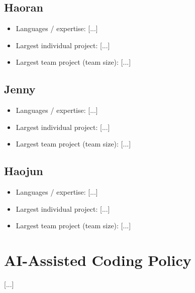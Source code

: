 \documentclass[11pt]{article}
\begin{document}
\subsection{Haoran}
\begin{itemize}[nosep]
    \item Languages / expertise: [...]
    \item Largest individual project: [...]
    \item Largest team project (team size): [...]
\end{itemize}

\subsection{Jenny}
\begin{itemize}[nosep]
    \item Languages / expertise: [...]
    \item Largest individual project: [...]
    \item Largest team project (team size): [...]
\end{itemize}

\subsection{Haojun}
\begin{itemize}[nosep]
    \item Languages / expertise: [...]
    \item Largest individual project: [...]
    \item Largest team project (team size): [...]
\end{itemize}

\section{AI-Assisted Coding Policy}
[...]
\end{document}
